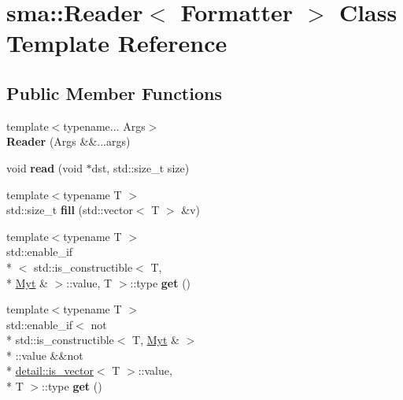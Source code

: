 \hypertarget{classsma_1_1Reader}{\section{sma\-:\-:Reader$<$ Formatter $>$ Class Template Reference}
\label{classsma_1_1Reader}
}
\subsection*{Public Member Functions}
\begin{DoxyCompactItemize}
\item 
\hypertarget{classsma_1_1Reader_a9783e0d5e9080934183047c0da53a7dc}{{\footnotesize template$<$typename... Args$>$ }\\{\bfseries Reader} (Args \&\&...args)}\label{classsma_1_1Reader_a9783e0d5e9080934183047c0da53a7dc}

\item 
\hypertarget{classsma_1_1Reader_ad281541d0a8458bfd8ddbabf1968787b}{void {\bfseries read} (void $\ast$dst, std\-::size\-\_\-t size)}\label{classsma_1_1Reader_ad281541d0a8458bfd8ddbabf1968787b}

\item 
\hypertarget{classsma_1_1Reader_a9e3227192142a1a6c28b52d98710eb42}{{\footnotesize template$<$typename T $>$ }\\std\-::size\-\_\-t {\bfseries fill} (std\-::vector$<$ T $>$ \&v)}\label{classsma_1_1Reader_a9e3227192142a1a6c28b52d98710eb42}

\item 
\hypertarget{classsma_1_1Reader_a5188e6eb294e4cb93cf1f43a150313e3}{{\footnotesize template$<$typename T $>$ }\\std\-::enable\-\_\-if\\*
$<$ std\-::is\-\_\-constructible$<$ T, \\*
\hyperlink{classsma_1_1Reader}{Myt} \& $>$\-::value, T $>$\-::type {\bfseries get} ()}\label{classsma_1_1Reader_a5188e6eb294e4cb93cf1f43a150313e3}

\item 
\hypertarget{classsma_1_1Reader_a05624eeb77abe598c1e6cf3a40e02ce7}{{\footnotesize template$<$typename T $>$ }\\std\-::enable\-\_\-if$<$ not \\*
std\-::is\-\_\-constructible$<$ T, \hyperlink{classsma_1_1Reader}{Myt} \& $>$\\*
\-::value \&\&not \\*
\hyperlink{structsma_1_1detail_1_1is__vector}{detail\-::is\-\_\-vector}$<$ T $>$\-::value, \\*
T $>$\-::type {\bfseries get} ()}\label{classsma_1_1Reader_a05624eeb77abe598c1e6cf3a40e02ce7}


\end{DoxyCompactItemize}

